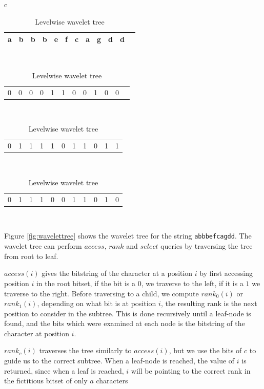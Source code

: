 \begin{table}[t!]
	\begin{center}
		\begin{tabular}{c}
            \begin{tabular}{c c c c c c c c c c c c}
                a & b & b & b & e & f & c & a & g & d & d \\
                \hline
            \end{tabular} \\
            \begin{tabular}{c c c c c c c c c c c c}
                0 & 0 & 0 & 0 & 1 & 1 & 0 & 0 & 1 & 0 & 0
            \end{tabular} \\
            \begin{tabular}{c c c c c c c c|c c c}
                0 & 1 & 1 & 1 & 1 & 0 & 1 & 1 & 0 & 1 & 1
            \end{tabular} \\
            \begin{tabular}{c c c c c|c c c|c c|c}
                0 & 1 & 1 & 1 & 0 & 0 & 1 & 1 & 0 & 1 & 0
            \end{tabular} \\
		\end{tabular}
		\caption{Levelwise wavelet tree}
		\label{table:levelwisewavelettree}
	\end{center}
\end{table}




Figure \ref{fig:wavelettree} shows the wavelet tree for the string \verb|abbbefcagdd|. The
wavelet tree can perform $access$, $rank$ and $select$ queries by traversing the tree from
root to leaf. 

$access(i)$ gives the bitstring of the character at a position $i$ by first accessing
position $i$ in the root bitset, if the bit is a $0$, we traverse to the left, if it is a
$1$ we traverse to the right. Before traversing to a child, we compute $rank_0(i)$ or
$rank_1(i)$, depending on what bit is at position $i$, the resulting rank is the next
position to consider in the subtree. This is done recursively until a leaf-node is found,
and the bits which were examined at each node is the bitstring of the character at
position $i$.

$rank_c(i)$ traverses the tree similarly to $access(i)$, but we use the bits of $c$ to
guide us to the correct subtree. When a leaf-node is reached, the value of $i$ is
returned, since when a leaf is reached, $i$ will be pointing to the correct rank in the
fictitious bitset of only $a$ characters

